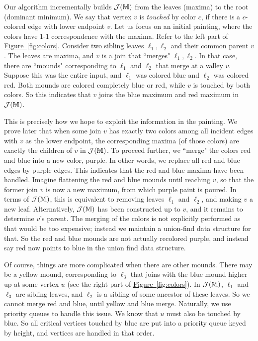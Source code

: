 \documentclass[11pt]{article}
\theoremstyle{definition}
\newcommand{\cJ}{{\cal J}}
\newcommand{\MM}{\mathbb{M}}
\newcommand{\Fig}[1]{\hyperref[fig:#1]{Figure~\ref*{fig:#1}}} %
\begin{document}
{Our algorithm incrementally builds $\cJ(\MM)$ from the leaves (maxima) to the root (dominant minimum). 
We say that vertex $v$ is \emph{touched} by color $c$, if there is a $c$-colored edge with lower endpoint $v$.
Let us focus on an initial painting, where the colors have 1-1 correspondence with the maxima. Refer to the left part of \Fig{colors}.
Consider two sibling leaves $\ell_1, \ell_2$ and their common parent $v$. The leaves are maxima,
and $v$ is a join that ``merges" $\ell_1, \ell_2$. 
In that case, there are ``mounds" corresponding to $\ell_1$ and $\ell_2$ that merge
at a valley $v$. Suppose this was the entire input, and $\ell_1$ was colored blue and $\ell_2$ was colored red. 
Both mounds are colored completely blue or red, while $v$ is touched by both colors.
So this indicates that $v$ joins the blue maximum and red maximum in $\cJ(\MM)$.

This is precisely how we hope to exploit the information in the painting. We prove later that
when some join $v$ has exactly two colors among all incident edges with $v$ as the lower endpoint, the corresponding maxima (of those colors) are exactly
the children of $v$ in $\cJ(\MM)$. To proceed further, we ``merge" the colors red and blue into a new color, purple. In other words,
we replace all red and blue edges by purple edges. This indicates that the red and blue maxima have been
handled. Imagine flattening the red and blue mounds until reaching $v$, so that the former join $v$
is now a new maximum, from which purple paint is poured. In terms of $\cJ(\MM)$, this
is equivalent to removing leaves $\ell_1$ and $\ell_2$, and making $v$ a new leaf.
Alternatively, $\cJ(\MM)$ has been constructed up to $v$, and it remains to determine $v$'s parent.
The merging of the colors is not explicitly performed as that would be too expensive; instead we maintain a union-find
data structure for that. So the red and blue mounds are not actually recolored purple, 
and instead say red now points to blue in the union find data structure.

Of course, things are more complicated when there are other mounds. There may be a yellow mound,
corresponding to $\ell_3$ that joins with the blue mound higher up at some vertex $u$ (see the right part of \Fig{colors}). In $\cJ(\MM)$, $\ell_1$ and $\ell_3$
are sibling leaves, and $\ell_2$ is a sibling of some ancestor of these leaves. So we cannot
merge red and blue, until yellow and blue merge. Naturally, we use priority queues to handle this issue.
We know that $u$ must also be touched by blue. So all critical vertices touched by blue
are put into a priority queue keyed by height, and vertices are handled in that order.

}
\end{document}

